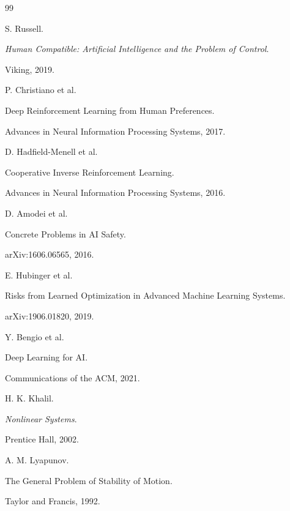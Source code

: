 \documentclass[11pt]{article}
\begin{document}
\begin{thebibliography}{99}



S. Russell.

\textit{Human Compatible: Artificial Intelligence and the Problem of
Control}.

Viking, 2019.




P. Christiano et al.

Deep Reinforcement Learning from Human Preferences.

Advances in Neural Information Processing Systems, 2017.




D. Hadfield-Menell et al.

Cooperative Inverse Reinforcement Learning.

Advances in Neural Information Processing Systems, 2016.




D. Amodei et al.

Concrete Problems in AI Safety.

arXiv:1606.06565, 2016.




E. Hubinger et al.

Risks from Learned Optimization in Advanced Machine Learning Systems.

arXiv:1906.01820, 2019.




Y. Bengio et al.

Deep Learning for AI.

Communications of the ACM, 2021.




H. K. Khalil.

\textit{Nonlinear Systems}.

Prentice Hall, 2002.




A. M. Lyapunov.

The General Problem of Stability of Motion.

Taylor and Francis, 1992.




\end{thebibliography}
\end{document}
